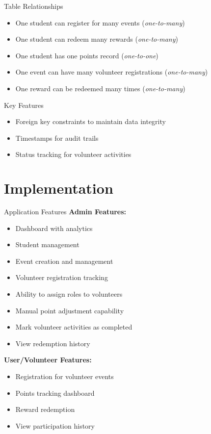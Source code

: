 \documentclass{beamer}
\begin{document}
\begin{frame}{Table Relationships}
  \begin{itemize}
    \item One student can register for many events (\textit{one-to-many})
    \item One student can redeem many rewards (\textit{one-to-many})
    \item One student has one points record (\textit{one-to-one})
    \item One event can have many volunteer registrations (\textit{one-to-many})
    \item One reward can be redeemed many times (\textit{one-to-many})
  \end{itemize}
  
  \begin{block}{Key Features}
    \begin{itemize}
      \item Foreign key constraints to maintain data integrity
      \item Timestamps for audit trails
      \item Status tracking for volunteer activities
    \end{itemize}
  \end{block}
\end{frame}

\section{Implementation}

\begin{frame}{Application Features}
  \textbf{Admin Features:}
  \begin{itemize}
    \item Dashboard with analytics
    \item Student management
    \item Event creation and management
    \item Volunteer registration tracking
    \item Ability to assign roles to volunteers
    \item Manual point adjustment capability
    \item Mark volunteer activities as completed
    \item View redemption history
  \end{itemize}
  
  \textbf{User/Volunteer Features:}
  \begin{itemize}
    \item Registration for volunteer events
    \item Points tracking dashboard
    \item Reward redemption
    \item View participation history
  \end{itemize}
\end{frame}
\end{document}
